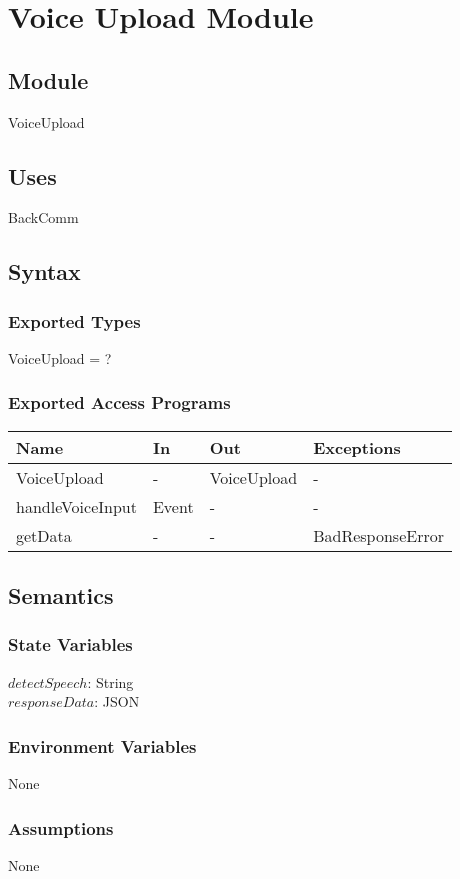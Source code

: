 \documentclass[12pt, titlepage]{article}
\begin{document}
\newpage

\section{Voice Upload Module} \label{VoiceUpload} 
\subsection{Module}
VoiceUpload
\subsection{Uses}
BackComm
\subsection{Syntax}
\subsubsection{Exported Types}
VoiceUpload = ?
\subsubsection{Exported Access Programs}
\begin{center}
	\begin{tabular}{p{3cm} p{4cm} p{4cm} p{2cm}}
		\hline
		\textbf{Name} & \textbf{In} & \textbf{Out} & \textbf{Exceptions} \\
		\hline
		VoiceUpload & - & VoiceUpload & - \\
		handleVoiceInput & Event & - & - \\
		getData & - & - & BadResponseError \\
		\hline
	\end{tabular}
\end{center}
\subsection{Semantics}
\subsubsection{State Variables}
$ detectSpeech $: String\\
$responseData$: JSON
\subsubsection{Environment Variables}
None
\subsubsection{Assumptions}
None
\end{document}
